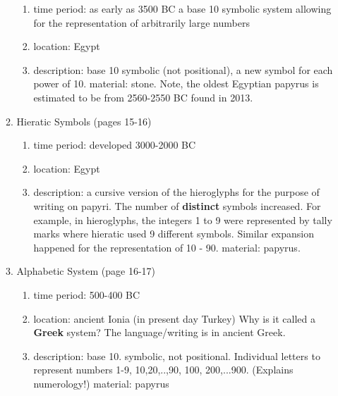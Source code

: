 \documentclass[12pt]{article}
\begin{document}
\begin{enumerate}
\begin{enumerate}
		\begin{enumerate}
		\item time period: as early as 3500 BC a base 10 symbolic system allowing for the representation of arbitrarily large numbers
		\item location: Egypt
		\item description: base 10 symbolic (not positional), a new symbol for each power of 10. material: stone. Note, the oldest Egyptian papyrus is estimated to be from 2560-2550 BC found in 2013.
		\vfill
		\end{enumerate}
	\item Hieratic Symbols (pages 15-16)
		\begin{enumerate}
		\item time period: developed 3000-2000 BC
		\item location: Egypt
		\item description: a cursive version of the hieroglyphs for the purpose of writing on papyri. The number of \textbf{distinct} symbols increased. For example, in hieroglyphs, the integers 1 to 9 were represented by tally marks where hieratic used 9 different symbols. Similar expansion happened for the representation of 10 - 90. material: papyrus.
		\vfill
		\end{enumerate}
	\item Alphabetic System (page 16-17)
		\begin{enumerate}
		\item time period: 500-400 BC
		\item location: ancient Ionia (in present day Turkey) Why is it called a \textbf{Greek} system? The language/writing is in ancient Greek.
		\item description: base 10. symbolic, not positional. Individual letters to represent numbers 1-9, 10,20,..,90, 100, 200,...900. (Explains numerology!) material: papyrus
		\vfill
		\end{enumerate}
	\end{enumerate}
\end{enumerate}
\end{document}
